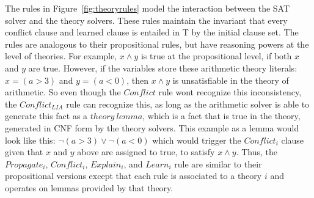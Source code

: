 \documentclass{article}
\begin{document}
The rules in Figure~\ref{fig:theoryrules} model the 
interaction between the SAT solver and the theory solvers.
These rules maintain the invariant that every 
conflict clause and learned 
clause is entailed in T by the initial clause set.
The rules are analogous to their propositional rules, but 
have reasoning powers at the level of theories. For example, 
$x \land y$ is true at the propositional level, if both 
$x$ and $y$ are true. However, if the variables store these 
arithmetic theory literals: \\
$x = (a > 3)$ and $y = (a < 0)$, then $x \land y$ is 
unsatisfiable in the theory of arithmetic. So even though 
the $Conflict$ rule wont recognize this inconsistency, 
the $Conflict_{LIA}$ rule can recognize this, as long as 
the arithmetic solver is able to generate this fact as a 
$theory\ lemma$, which is a fact that is true in the theory, 
generated in CNF form by the theory solvers. This example
as a lemma would look like this:
$\neg (a > 3) \lor \neg (a < 0)$ which would trigger the 
$Conflict_i$ clause given that $x$ and $y$ above are assigned 
to true, to satisfy $x \land y$. Thus, the $Propagate_i$, 
$Conflict_i$, $Explain_i$, and $Learn_i$ rule are similar 
to their propositional versions except that each rule is 
associated to a theory $i$ and operates on lemmas 
provided by that theory. 
\end{document}
